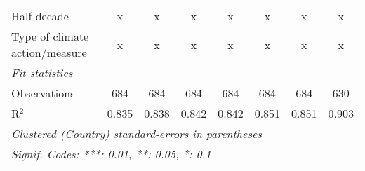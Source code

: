 \begin{table}[htbp]
\begin{tabular}{lccccccc}
      Half decade                                                           & x              & x              & x              & x              & x              & x              & x\\  
      Type of climate action/measure                                        & x              & x              & x              & x              & x              & x              & x\\  
      \midrule \emph{Fit statistics}\\
      Observations                                                          & 684            & 684            & 684            & 684            & 684            & 684            & 630\\  
      R$^2$                                                                 & 0.835          & 0.838          & 0.842          & 0.842          & 0.851          & 0.851          & 0.903\\  
      \midrule
      \multicolumn{8}{l}{\emph{Clustered (Country) standard-errors in parentheses}}\\
      \multicolumn{8}{l}{\emph{Signif. Codes: ***: 0.01, **: 0.05, *: 0.1}}\\
   \end{tabular}
\end{table}


